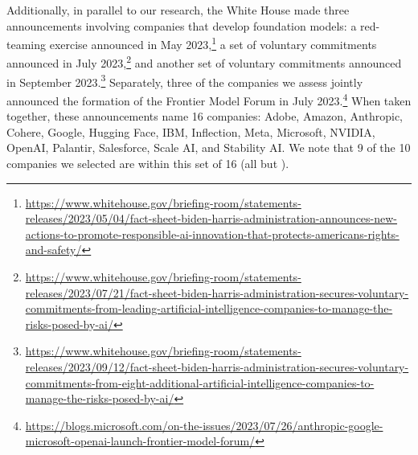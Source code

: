 Additionally, in parallel to our research, the White House made three announcements involving companies that develop foundation models: a red-teaming exercise announced in May 2023,\footnote{\url{https://www.whitehouse.gov/briefing-room/statements-releases/2023/05/04/fact-sheet-biden-harris-administration-announces-new-actions-to-promote-responsible-ai-innovation-that-protects-americans-rights-and-safety/}} a set of voluntary commitments announced in July 2023,\footnote{\url{https://www.whitehouse.gov/briefing-room/statements-releases/2023/07/21/fact-sheet-biden-harris-administration-secures-voluntary-commitments-from-leading-artificial-intelligence-companies-to-manage-the-risks-posed-by-ai/}} and another set of voluntary commitments announced in September 2023.\footnote{\url{https://www.whitehouse.gov/briefing-room/statements-releases/2023/09/12/fact-sheet-biden-harris-administration-secures-voluntary-commitments-from-eight-additional-artificial-intelligence-companies-to-manage-the-risks-posed-by-ai/}}
Separately, three of the companies we assess jointly announced the formation of the Frontier Model Forum in July 2023.\footnote{\url{https://blogs.microsoft.com/on-the-issues/2023/07/26/anthropic-google-microsoft-openai-launch-frontier-model-forum/}} 
When taken together, these announcements name 16 companies: Adobe, Amazon, Anthropic, Cohere, Google, Hugging Face, IBM, Inflection, Meta, Microsoft, NVIDIA, OpenAI, Palantir, Salesforce, Scale AI, and Stability AI.
We note that 9 of the 10 companies we selected are within this set of 16 (all but \aitwentyone).


